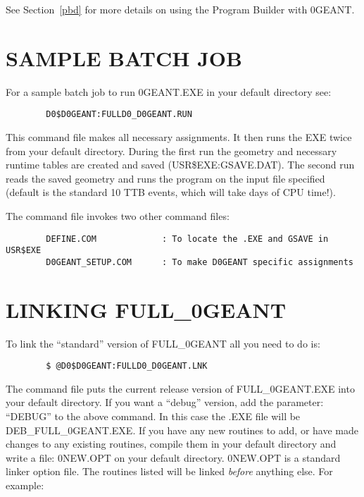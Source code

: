 See Section~\ref{pbd} for more details on using the Program Builder with \D0GEANT.

\section {SAMPLE BATCH JOB}
\label{Samplejob}

For a sample batch job to run \D0GEANT.EXE in your default
directory see:

\begin{verbatim}
        D0$D0GEANT:FULLD0_D0GEANT.RUN
\end{verbatim}

This command file makes all necessary assignments. It then runs the EXE twice
from your default directory. During the first run the geometry and necessary
runtime tables are created and saved (USR\$EXE:GSAVE.DAT).
The second run reads the saved geometry and runs the program on the
input file specified (default is the standard 10 TTB events, which
will take days of CPU time!).

The command file invokes two other command files:

\begin{verbatim}
        DEFINE.COM             : To locate the .EXE and GSAVE in USR$EXE
        D0GEANT_SETUP.COM      : To make D0GEANT specific assignments
\end{verbatim}

\section{LINKING FULL\_\D0GEANT}
\label{linking}

To link the ``standard'' version of FULL\_\D0GEANT all you need to do is:

\begin{verbatim}
        $ @D0$D0GEANT:FULLD0_D0GEANT.LNK
\end{verbatim}

The command file puts the current release version of FULL\_\D0GEANT.EXE into
your default directory.  If you want a ``debug'' version, add the parameter:
``DEBUG'' to the above command.  In this case the .EXE file will be
DEB\_FULL\_\D0GEANT.EXE. If you have any new routines to add, or have made
changes to any existing  routines, compile them in your default directory and
write a file: \D0NEW.OPT on your default directory. \D0NEW.OPT is a standard
linker option file. The routines listed will be linked {\em before} anything else.
For example:

